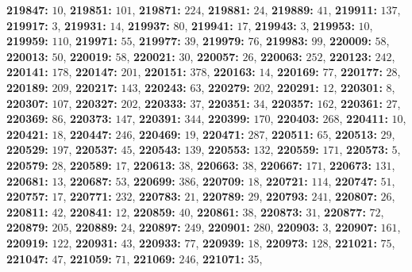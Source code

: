 \textsf{\bfseries 219847:} $10$, \textsf{\bfseries 219851:} $101$, \textsf{\bfseries 219871:} $224$, \textsf{\bfseries 219881:} $24$, \textsf{\bfseries 219889:} $41$, \textsf{\bfseries 219911:} $137$, \textsf{\bfseries 219917:} $3$, \textsf{\bfseries 219931:} $14$, \textsf{\bfseries 219937:} $80$, \textsf{\bfseries 219941:} $17$, \textsf{\bfseries 219943:} $3$, \textsf{\bfseries 219953:} $10$, \textsf{\bfseries 219959:} $110$, \textsf{\bfseries 219971:} $55$, \textsf{\bfseries 219977:} $39$, \textsf{\bfseries 219979:} $76$, \textsf{\bfseries 219983:} $99$, \textsf{\bfseries 220009:} $58$, \textsf{\bfseries 220013:} $50$, \textsf{\bfseries 220019:} $58$, \textsf{\bfseries 220021:} $30$, \textsf{\bfseries 220057:} $26$, \textsf{\bfseries 220063:} $252$, \textsf{\bfseries 220123:} $242$, \textsf{\bfseries 220141:} $178$, \textsf{\bfseries 220147:} $201$, \textsf{\bfseries 220151:} $378$, \textsf{\bfseries 220163:} $14$, \textsf{\bfseries 220169:} $77$, \textsf{\bfseries 220177:} $28$, \textsf{\bfseries 220189:} $209$, \textsf{\bfseries 220217:} $143$, \textsf{\bfseries 220243:} $63$, \textsf{\bfseries 220279:} $202$, \textsf{\bfseries 220291:} $12$, \textsf{\bfseries 220301:} $8$, \textsf{\bfseries 220307:} $107$, \textsf{\bfseries 220327:} $202$, \textsf{\bfseries 220333:} $37$, \textsf{\bfseries 220351:} $34$, \textsf{\bfseries 220357:} $162$, \textsf{\bfseries 220361:} $27$, \textsf{\bfseries 220369:} $86$, \textsf{\bfseries 220373:} $147$, \textsf{\bfseries 220391:} $344$, \textsf{\bfseries 220399:} $170$, \textsf{\bfseries 220403:} $268$, \textsf{\bfseries 220411:} $10$, \textsf{\bfseries 220421:} $18$, \textsf{\bfseries 220447:} $246$, \textsf{\bfseries 220469:} $19$, \textsf{\bfseries 220471:} $287$, \textsf{\bfseries 220511:} $65$, \textsf{\bfseries 220513:} $29$, \textsf{\bfseries 220529:} $197$, \textsf{\bfseries 220537:} $45$, \textsf{\bfseries 220543:} $139$, \textsf{\bfseries 220553:} $132$, \textsf{\bfseries 220559:} $171$, \textsf{\bfseries 220573:} $5$, \textsf{\bfseries 220579:} $28$, \textsf{\bfseries 220589:} $17$, \textsf{\bfseries 220613:} $38$, \textsf{\bfseries 220663:} $38$, \textsf{\bfseries 220667:} $171$, \textsf{\bfseries 220673:} $131$, \textsf{\bfseries 220681:} $13$, \textsf{\bfseries 220687:} $53$, \textsf{\bfseries 220699:} $386$, \textsf{\bfseries 220709:} $18$, \textsf{\bfseries 220721:} $114$, \textsf{\bfseries 220747:} $51$, \textsf{\bfseries 220757:} $17$, \textsf{\bfseries 220771:} $232$, \textsf{\bfseries 220783:} $21$, \textsf{\bfseries 220789:} $29$, \textsf{\bfseries 220793:} $241$, \textsf{\bfseries 220807:} $26$, \textsf{\bfseries 220811:} $42$, \textsf{\bfseries 220841:} $12$, \textsf{\bfseries 220859:} $40$, \textsf{\bfseries 220861:} $38$, \textsf{\bfseries 220873:} $31$, \textsf{\bfseries 220877:} $72$, \textsf{\bfseries 220879:} $205$, \textsf{\bfseries 220889:} $24$, \textsf{\bfseries 220897:} $249$, \textsf{\bfseries 220901:} $280$, \textsf{\bfseries 220903:} $3$, \textsf{\bfseries 220907:} $161$, \textsf{\bfseries 220919:} $122$, \textsf{\bfseries 220931:} $43$, \textsf{\bfseries 220933:} $77$, \textsf{\bfseries 220939:} $18$, \textsf{\bfseries 220973:} $128$, \textsf{\bfseries 221021:} $75$, \textsf{\bfseries 221047:} $47$, \textsf{\bfseries 221059:} $71$, \textsf{\bfseries 221069:} $246$, \textsf{\bfseries 221071:} $35$, 
